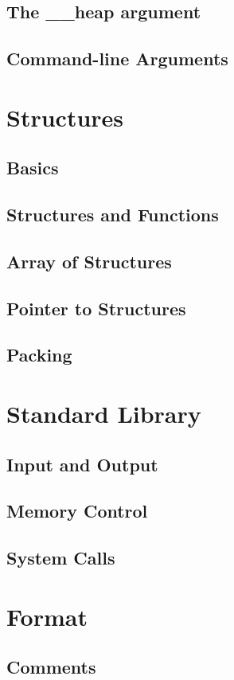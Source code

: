 \documentclass{scrartcl}
\begin{document}
        \subsection{The \_\_heap argument}
        \subsection{Command-line Arguments}
    \section{Structures}
        \subsection{Basics}
        \subsection{Structures and Functions}
        \subsection{Array of Structures}
        \subsection{Pointer to Structures}
        \subsection{Packing}
    \section{Standard Library}
        \subsection{Input and Output}
        \subsection{Memory Control}
        \subsection{System Calls}
    \section{Format}
        \subsection{Comments}
\end{document}
